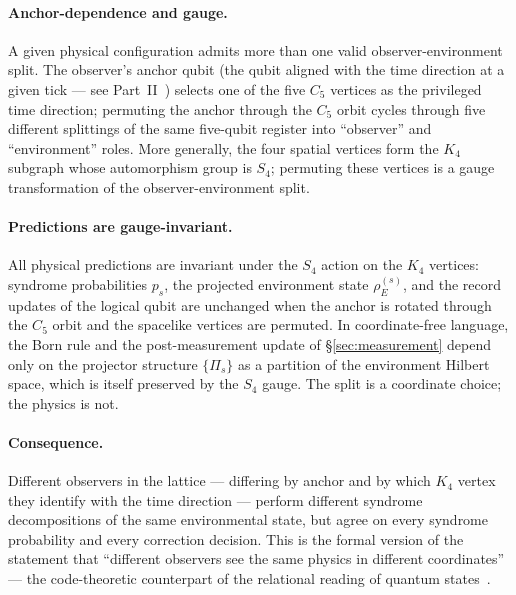 \documentclass[11pt,a4paper]{article}
\newcommand{\proj}[1]{\Pi_{#1}}
\begin{document}
\paragraph{Anchor-dependence and gauge.}
A given physical configuration admits more than one valid observer-environment split. The observer's anchor qubit (the qubit aligned with the time direction at a given tick --- see Part~II~\cite{Hubka2026QSD}) selects one of the five $C_5$ vertices as the privileged time direction; permuting the anchor through the $C_5$ orbit cycles through five different splittings of the same five-qubit register into ``observer'' and ``environment'' roles. More generally, the four spatial vertices form the $K_4$ subgraph whose automorphism group is $S_4$; permuting these vertices is a gauge transformation of the observer-environment split.

\paragraph{Predictions are gauge-invariant.}
All physical predictions are invariant under the $S_4$ action on the $K_4$ vertices: syndrome probabilities $p_s$, the projected environment state $\rho_E^{(s)}$, and the record updates of the logical qubit are unchanged when the anchor is rotated through the $C_5$ orbit and the spacelike vertices are permuted. In coordinate-free language, the Born rule and the post-measurement update of \S\ref{sec:measurement} depend only on the projector structure $\{\proj{s}\}$ as a partition of the environment Hilbert space, which is itself preserved by the $S_4$ gauge. The split is a coordinate choice; the physics is not.

\paragraph{Consequence.}
Different observers in the lattice --- differing by anchor and by which $K_4$ vertex they identify with the time direction --- perform different syndrome decompositions of the same environmental state, but agree on every syndrome probability and every correction decision. This is the formal version of the statement that ``different observers see the same physics in different coordinates'' --- the code-theoretic counterpart of the relational reading of quantum states~\cite{Rovelli1996,Everett1957}.
\end{document}
